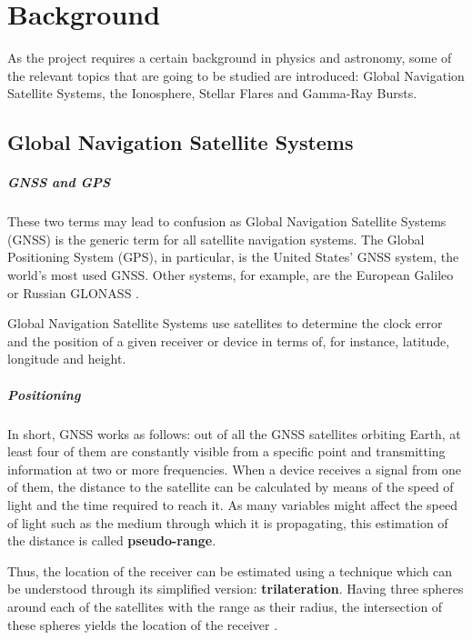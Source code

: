 \chapter{Background}

As the project requires a certain background in physics and astronomy, some of the relevant topics that are going to be studied are introduced: Global Navigation Satellite Systems, the Ionosphere, Stellar Flares and Gamma-Ray Bursts.

\section{Global Navigation Satellite Systems}

\paragraph{GNSS and GPS}

These two terms may lead to confusion as Global Navigation Satellite Systems (GNSS) is the generic term for all satellite navigation systems. The Global Positioning System (GPS), in particular, is the United States' GNSS system, the world's most used GNSS. Other systems, for example, are the European Galileo or Russian GLONASS \cite{hegarty2008evolution}.

Global Navigation Satellite Systems use satellites to determine the clock error and the position of a given receiver or device in terms of, for instance, latitude, longitude and height. 

\paragraph{Positioning}

In short, GNSS works as follows: out of all the GNSS satellites orbiting Earth, at least four of them are constantly visible from a specific point and transmitting information at two or more frequencies. When a device receives a signal from one of them, the distance to the satellite can be calculated by means of the speed of light and the time required to reach it. As many variables might affect the speed of light such as the medium through which it is propagating, this estimation of the distance is called \textbf{pseudo-range}. 

Thus, the location of the receiver can be estimated using a technique which can be understood through its simplified version: \textbf{trilateration}. Having three spheres around each of the satellites with the range as their radius, the intersection of these spheres yields the location of the receiver \cite{hofmann2007gnss}. 

